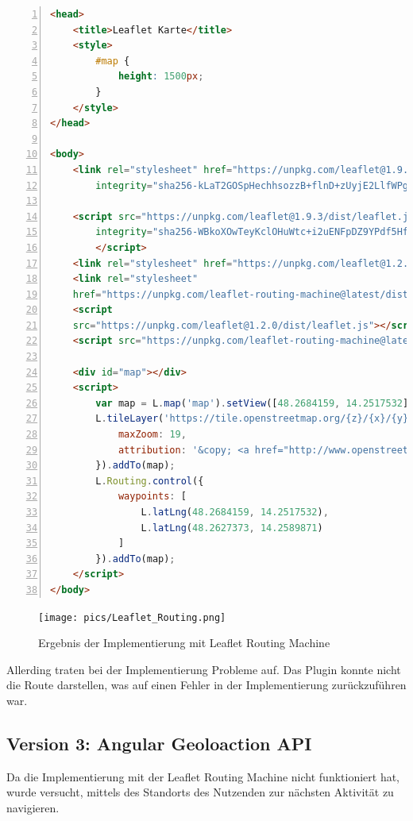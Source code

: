 \begin{lstlisting}[numbers=left,language=HTML,caption={Implementierung einer Karte mit Leaflet Routing Engine},
    label={lst:leafletmap}]
<head>
    <title>Leaflet Karte</title>
    <style>
        #map {
            height: 1500px;
        }
    </style>
</head>

<body>
    <link rel="stylesheet" href="https://unpkg.com/leaflet@1.9.3/dist/leaflet.css"
        integrity="sha256-kLaT2GOSpHechhsozzB+flnD+zUyjE2LlfWPgU04xyI=" crossorigin="" />

    <script src="https://unpkg.com/leaflet@1.9.3/dist/leaflet.js"
        integrity="sha256-WBkoXOwTeyKclOHuWtc+i2uENFpDZ9YPdf5Hf+D7ewM=" crossorigin="">
        </script>
    <link rel="stylesheet" href="https://unpkg.com/leaflet@1.2.0/dist/leaflet.css" />
    <link rel="stylesheet" 
    href="https://unpkg.com/leaflet-routing-machine@latest/dist/leaflet-routing-machine.css" />
    <script 
    src="https://unpkg.com/leaflet@1.2.0/dist/leaflet.js"></script>
    <script src="https://unpkg.com/leaflet-routing-machine@latest/dist/leaflet-routing-machine.js"></script>

    <div id="map"></div>
    <script>
        var map = L.map('map').setView([48.2684159, 14.2517532], 15);
        L.tileLayer('https://tile.openstreetmap.org/{z}/{x}/{y}.png', {
            maxZoom: 19,
            attribution: '&copy; <a href="http://www.openstreetmap.org/copyright">OpenStreetMap</a>'
        }).addTo(map);
        L.Routing.control({
            waypoints: [
                L.latLng(48.2684159, 14.2517532),
                L.latLng(48.2627373, 14.2589871)
            ]
        }).addTo(map);
    </script>
</body>
\end{lstlisting}

\begin{figure}[h]
    \centering
    \texttt{[image: pics/Leaflet\_Routing.png]}
    \caption{Ergebnis der Implementierung mit Leaflet Routing Machine}
\end{figure}

Allerding traten bei der Implementierung Probleme auf. Das Plugin konnte nicht die Route darstellen, was auf einen Fehler in der Implementierung zurückzuführen war.

\subsection{Version 3: Angular Geoloaction API}
Da die Implementierung mit der Leaflet Routing Machine nicht funktioniert hat, wurde versucht, mittels des Standorts des Nutzenden zur nächsten Aktivität zu navigieren. 

